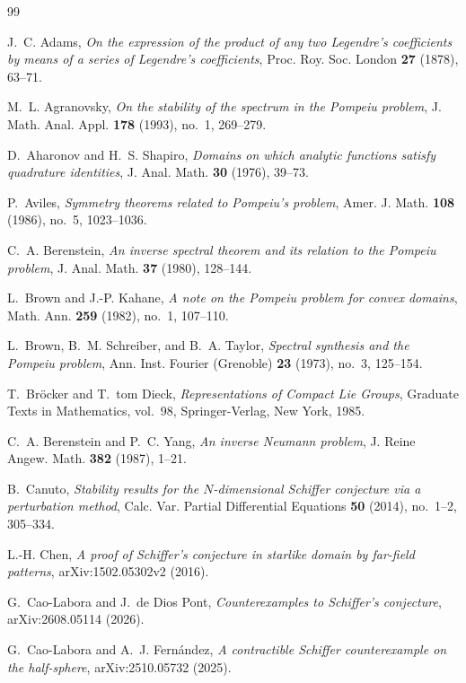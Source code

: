 \documentclass[11pt]{amsart}
\theoremstyle{definition}
\theoremstyle{remark}
\numberwithin{equation}{section}
\begin{document}
\begin{thebibliography}{99}

J.~C. Adams, \emph{On the expression of the product of any two Legendre's coefficients by means of a series of Legendre's coefficients}, Proc. Roy. Soc. London \textbf{27} (1878), 63--71.

M.~L. Agranovsky, \emph{On the stability of the spectrum in the Pompeiu problem}, J. Math. Anal. Appl. \textbf{178} (1993), no.~1, 269--279.

D.~Aharonov and H.~S. Shapiro, \emph{Domains on which analytic functions satisfy quadrature identities}, J. Anal. Math. \textbf{30} (1976), 39--73.

P.~Aviles, \emph{Symmetry theorems related to Pompeiu's problem}, Amer. J. Math. \textbf{108} (1986), no.~5, 1023--1036.

C.~A. Berenstein, \emph{An inverse spectral theorem and its relation to the Pompeiu problem}, J. Anal. Math. \textbf{37} (1980), 128--144.

L.~Brown and J.-P. Kahane, \emph{A note on the Pompeiu problem for convex domains}, Math. Ann. \textbf{259} (1982), no.~1, 107--110.

L.~Brown, B.~M. Schreiber, and B.~A. Taylor, \emph{Spectral synthesis and the Pompeiu problem}, Ann. Inst. Fourier (Grenoble) \textbf{23} (1973), no.~3, 125--154.

T.~Br\"ocker and T.~tom Dieck, \emph{Representations of Compact Lie Groups}, Graduate Texts in Mathematics, vol.~98, Springer-Verlag, New York, 1985.

C.~A. Berenstein and P.~C. Yang, \emph{An inverse Neumann problem}, J. Reine Angew. Math. \textbf{382} (1987), 1--21.

B.~Canuto, \emph{Stability results for the $N$-dimensional Schiffer conjecture via a perturbation method}, Calc. Var. Partial Differential Equations \textbf{50} (2014), no.~1--2, 305--334.

L.-H. Chen, \emph{A proof of Schiffer's conjecture in starlike domain by far-field patterns}, arXiv:1502.05302v2 (2016).

G.~Cao-Labora and J.~de Dios Pont, \emph{Counterexamples to Schiffer's conjecture}, arXiv:2608.05114 (2026).

G.~Cao-Labora and A.~J. Fern\'andez, \emph{A contractible Schiffer counterexample on the half-sphere}, arXiv:2510.05732 (2025).


\end{thebibliography}
\end{document}
